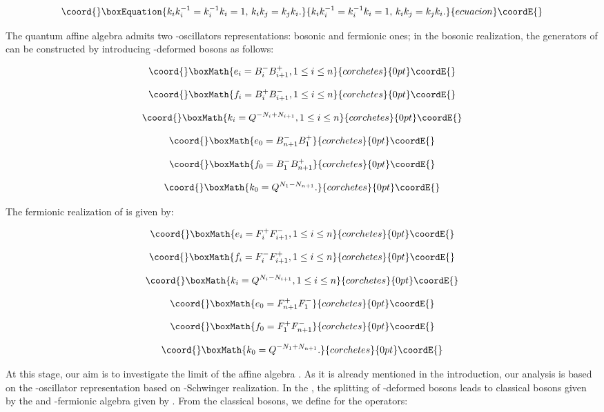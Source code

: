 \documentclass[a4paper,12pt,thmsa]{article}
\begin{document}
\begin{equation}\coord{}\boxEquation{
k_ik_i^{-1}=k_i^{-1}k_i=1,\, k_ik_j=k_jk_i.
}{
k_ik_i^{-1}=k_i^{-1}k_i=1,\, k_ik_j=k_jk_i.
}{ecuacion}\coordE{}\end{equation}

The quantum affine algebra \coordHE{} admits two \coordHE{}-oscillators
representations: bosonic and fermionic ones; in the bosonic realization, the
generators of \coordHE{} can be constructed by introducing \coordHE{}  \coordHE{}%
-deformed bosons as follows:

\[\coord{}\boxMath{
e_{i}=B_{i}^{-}B_{i+1}^{+},1\leq i\leq n
}{corchetes}{0pt}\coordE{}\]

\[\coord{}\boxMath{
f_{i}=B_{i}^{+}B_{i+1}^{-},1\leq i\leq n
}{corchetes}{0pt}\coordE{}\]

\[\coord{}\boxMath{
k_{i}=Q^{-N_{i}+N_{i+1}},1\leq i\leq n
}{corchetes}{0pt}\coordE{}\]

\[\coord{}\boxMath{
e_{0}=B_{n+1}^{-}B_{1}^{+}
}{corchetes}{0pt}\coordE{}\]

\[\coord{}\boxMath{
f_{0}=B_{1}^{-}B_{n+1}^{+}
}{corchetes}{0pt}\coordE{}\]

\[\coord{}\boxMath{
k_0=Q^{N_1-N_{n+1}}.
}{corchetes}{0pt}\coordE{}\]

The fermionic realization of \coordHE{} is given by:

\[\coord{}\boxMath{
e_i=F_i^{+}F_{i+1}^{-},1\leq i\leq n
}{corchetes}{0pt}\coordE{}\]

\[\coord{}\boxMath{
f_i=F_i^{-}F_{i+1}^{+},1\leq i\leq n
}{corchetes}{0pt}\coordE{}\]

\[\coord{}\boxMath{
k_i=Q^{N_i-N_{i+1}},1\leq i\leq n
}{corchetes}{0pt}\coordE{}\]

\[\coord{}\boxMath{
e_0=F_{n+1}^{+}F_1^{-}
}{corchetes}{0pt}\coordE{}\]

\[\coord{}\boxMath{
f_0=F_1^{+}F_{n+1}^{-}
}{corchetes}{0pt}\coordE{}\]

\[\coord{}\boxMath{
k_0=Q^{-N_1+N_{n+1}}.
}{corchetes}{0pt}\coordE{}\]

At this stage, our aim is to investigate the limit \coordHE{} of the
affine algebra \coordHE{}. As it is already mentioned in the
introduction, our analysis is based on the \coordHE{}-oscillator representation
based on \coordHE{}-Schwinger realization. In the \coordHE{}, the splitting
of \coordHE{}-deformed bosons leads to classical bosons \coordHE{}  \coordHE{} given by the \coordHE{}  \coordHE{} and \coordHE{}-fermionic algebra \coordHE{}  \coordHE{}given by \coordHE{}. From the
classical bosons, we define for \coordHE{} the operators:
\end{document}
